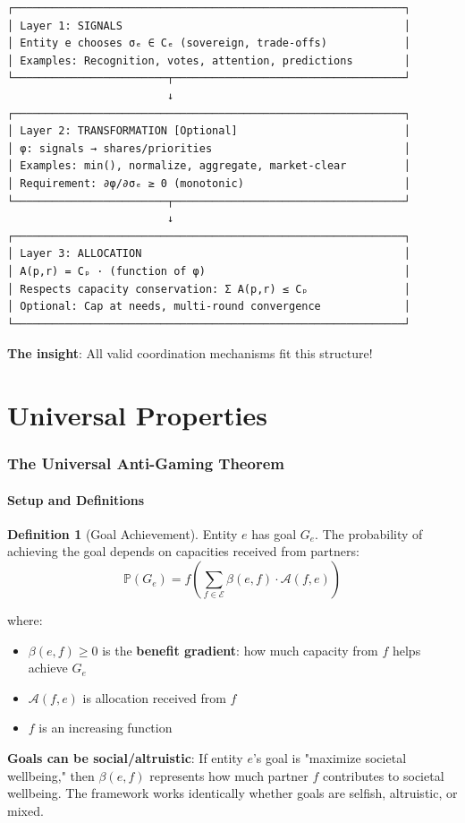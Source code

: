 \documentclass[11pt,a4paper]{article}
\theoremstyle{definition}
\newtheorem{definition}[theorem]{Definition}
\theoremstyle{remark}
\newcommand{\E}{\mathcal{E}}
\newcommand{\A}{\mathcal{A}}
\begin{document}
\begin{center}
\begin{verbatim}
┌─────────────────────────────────────────────────────────────┐
│ Layer 1: SIGNALS                                            │
│ Entity e chooses σₑ ∈ Cₑ (sovereign, trade-offs)            │
│ Examples: Recognition, votes, attention, predictions        │
└────────────────────────┬────────────────────────────────────┘
                         ↓
┌─────────────────────────────────────────────────────────────┐
│ Layer 2: TRANSFORMATION [Optional]                          │
│ φ: signals → shares/priorities                              │
│ Examples: min(), normalize, aggregate, market-clear         │
│ Requirement: ∂φ/∂σₑ ≥ 0 (monotonic)                         │
└────────────────────────┬────────────────────────────────────┘
                         ↓
┌─────────────────────────────────────────────────────────────┐
│ Layer 3: ALLOCATION                                         │
│ A(p,r) = Cₚ · (function of φ)                               │
│ Respects capacity conservation: Σ A(p,r) ≤ Cₚ               │
│ Optional: Cap at needs, multi-round convergence             │
└─────────────────────────────────────────────────────────────┘
\end{verbatim}
\end{center}

\textbf{The insight}: All valid coordination mechanisms fit this structure!

\part{Universal Properties}

\section{The Universal Anti-Gaming Theorem}

\subsection{Setup and Definitions}

\begin{definition}[Goal Achievement]
Entity $e$ has goal $G_e$. The probability of achieving the goal depends on capacities received from partners:
\[ \mathbb{P}(G_e) = f\left(\sum_{f \in \E} \beta(e,f) \cdot \A(f,e)\right) \]

where:
\begin{itemize}
\item $\beta(e,f) \ge 0$ is the \textbf{benefit gradient}: how much capacity from $f$ helps achieve $G_e$
\item $\A(f,e)$ is allocation received from $f$
\item $f$ is an increasing function
\end{itemize}

\textbf{Goals can be social/altruistic}: If entity $e$'s goal is "maximize societal wellbeing," then $\beta(e,f)$ represents how much partner $f$ contributes to societal wellbeing. The framework works identically whether goals are selfish, altruistic, or mixed.
\end{definition}
\end{document}
